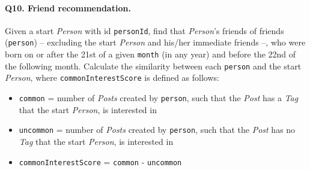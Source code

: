\paragraph{\textbf{Q10}. Friend recommendation.}
Given a start \emph{Person} with id \texttt{personId}, find that
\emph{Person}'s friends of friends (\texttt{person}) -- excluding the
start \emph{Person} and his/her immediate friends --, who were born on
or after the 21st of a given \texttt{month} (in any year) and before the
22nd of the following month. Calculate the similarity between each
\texttt{person} and the start \emph{Person}, where
\texttt{commonInterestScore} is defined as follows:
\begin{itemize}
\tightlist
\item
  \texttt{common} = number of \emph{Posts} created by \texttt{person},
  such that the \emph{Post} has a \emph{Tag} that the start
  \emph{Person}, is interested in
\item
  \texttt{uncommon} = number of \emph{Posts} created by \texttt{person},
  such that the \emph{Post} has no \emph{Tag} that the start
  \emph{Person}, is interested in
\item
  \texttt{commonInterestScore} = \texttt{common} - \texttt{uncommon}
\end{itemize}
